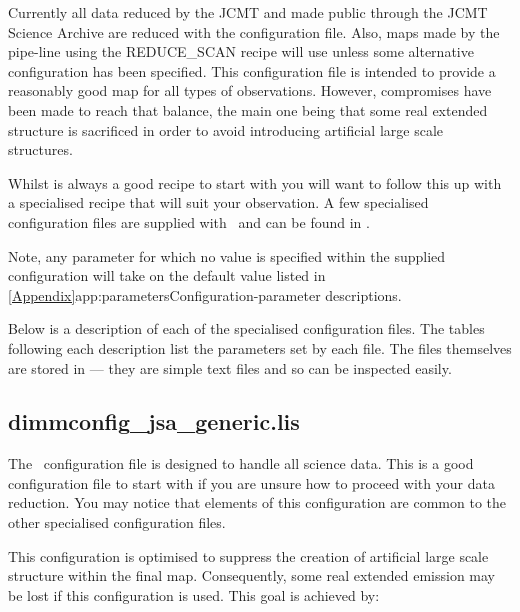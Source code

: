 Currently all data reduced by the JCMT and made public through the JCMT
Science Archive are reduced with the 
configuration file. Also, maps made by the pipe-line using the
REDUCE\_SCAN recipe will use  unless some
alternative configuration has been specified. This configuration file is
intended to provide a reasonably good map for all types of observations.
However, compromises have been made to reach that balance, the main one
being that some real extended structure is sacrificed in order to avoid
introducing artificial large scale structures.

Whilst  is always a good recipe to start with
you will want to follow this up with a specialised recipe that will suit
your observation. A few specialised configuration files are supplied with
\smurf\ and can be found in .

Note, any parameter for which no value is specified within the supplied
configuration will take on the default value listed in
\cref{Appendix}{app:parameters}{Configuration-parameter descriptions}.

Below is a description of each of the specialised configuration files.
The tables following each description list the parameters set by each file.
The files themselves are stored in  ---
they are simple text files and so can be inspected easily.

\subsection{dimmconfig\_jsa\_generic.lis}
The \jsageneric\ configuration file is designed to handle all science data. This is a good
configuration file to start with if you are unsure how to proceed with your
data reduction.  You may notice that elements of this configuration are
common to the other specialised configuration files.

This configuration is optimised to suppress the creation of artificial
large scale structure within the final map. Consequently, some real
extended emission may be lost if this configuration is used. This goal is
achieved by:

